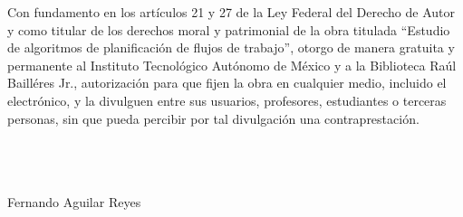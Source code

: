 \noindent Con fundamento en los artículos 21 y 27 de la Ley Federal del Derecho de Autor y como titular de los derechos moral y patrimonial de la obra titulada ``Estudio de algoritmos de planificación de flujos de trabajo'', otorgo de manera gratuita y permanente al Instituto Tecnológico Autónomo de México y a la Biblioteca Raúl Bailléres Jr., autorización para que fijen la obra en cualquier medio, incluido el electrónico, y la divulguen entre sus usuarios, profesores, estudiantes o terceras personas, sin que pueda percibir por tal divulgación una contraprestación.\\\\\\\\

\begin{center} 
Fernando Aguilar Reyes\\
\par\noindent\makebox[2.5in]{ }\\
\par\noindent\makebox[2.5in]{\hrulefill}\\
\par\noindent{}\\
\par\noindent\makebox[2.5in]{ }\\
\par\noindent\makebox[2.5in]{\hrulefill}\\
\par\noindent{}\\
\end{center}
\clearpage %
